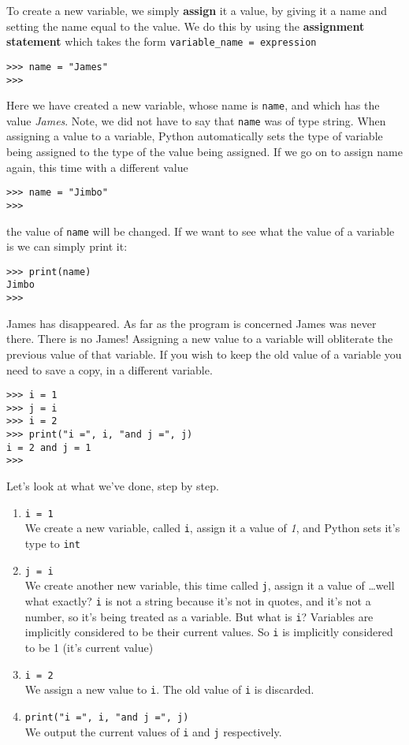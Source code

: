 To create a new variable, we simply \textbf{assign}   it a value, by giving it a name and setting the name equal to the   value. We do this by using the \textbf{assignment statement}   which takes the form \texttt{variable\_name = expression}
\begin{lstlisting}
>>> name = "James"
>>>
\end{lstlisting}

Here we have created a new variable, whose name is \texttt{name}, and which   has the value \textit{James}. Note, we did not have to say that \texttt{name} was of type string.   When assigning a value to a variable, Python automatically sets the type of   variable being assigned to the type of the value being assigned. If we   go on to assign name again, this time with a different value
\begin{lstlisting}
>>> name = "Jimbo"
>>>
\end{lstlisting}

the value of \texttt{name} will be changed. If we want to see what the value of   a variable is we can simply print it:
\begin{lstlisting}
>>> print(name)
Jimbo
>>>
\end{lstlisting}

James has disappeared. As far as the program is concerned James was   never there. There is no James! Assigning a new value to a variable   will obliterate the previous value of that variable. If you wish to   keep the old value of a variable you need to save a copy, in a   different variable.
\begin{lstlisting}
>>> i = 1
>>> j = i
>>> i = 2
>>> print("i =", i, "and j =", j)
i = 2 and j = 1
>>>
\end{lstlisting}

Let's look at what we've done, step by step.
\begin{enumerate}
	\item 
\texttt{i = 1}
\\     We create a new variable, called \texttt{i}, assign it a value of    \textit{1}, and Python sets it's type to \texttt{int}
	\item 
\texttt{j = i}
\\     We create another new variable, this time called \texttt{j}, assign it a    value of \ldots well what exactly? 
\texttt{i} is not a string    because it's not in quotes, and it's not a number, so it's being    treated as a variable. But what is \texttt{i}? Variables are implicitly    considered to be their current values. So 
\texttt{i} is    implicitly considered to be 1 (it's current value)
	\item 
\texttt{i = 2}
\\     We assign a new value to \texttt{i}. The old value of \texttt{i} is    discarded.
	\item 
\texttt{print("i =", i, "and j =", j)}
\\     We output the current values of \texttt{i} and \texttt{j} respectively.
\end{enumerate}


